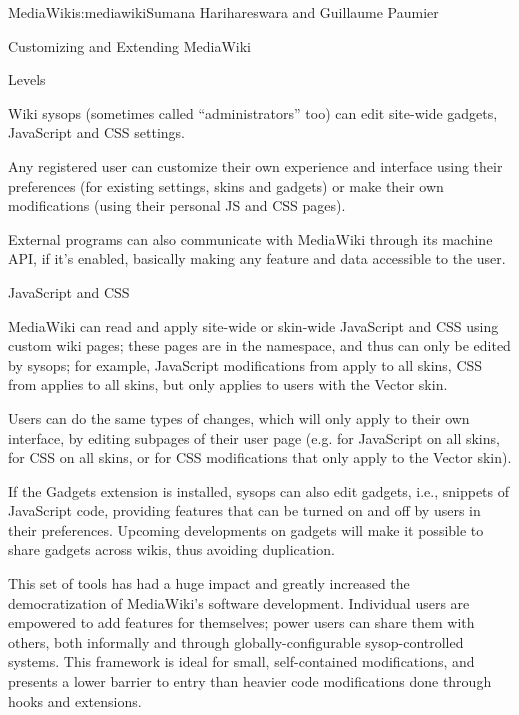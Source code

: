 \begin{aosachapter}{MediaWiki}{s:mediawiki}{Sumana Harihareswara and Guillaume Paumier}
\begin{aosasect1}{Customizing and Extending MediaWiki}
\begin{aosasect2}{Levels}
\begin{aosaitemize}
\item Wiki sysops (sometimes called ``administrators'' too) can edit
  site-wide gadgets, JavaScript and CSS settings.

\item Any registered user can customize their own experience and
  interface using their preferences (for existing settings, skins and
  gadgets) or make their own modifications (using their personal JS
  and CSS pages).

\end{aosaitemize}

External programs can also communicate with MediaWiki through its
machine API, if it's enabled, basically making any feature and data
accessible to the user.

\end{aosasect2}

\begin{aosasect2}{JavaScript and CSS}

MediaWiki can read and apply site-wide or skin-wide JavaScript and CSS
using custom wiki pages; these pages are in the 
namespace, and thus can only be edited by sysops; for example,
JavaScript modifications from  apply to all
skins, CSS from  applies to all skins, but
 only applies to users with the Vector
skin.

Users can do the same types of changes, which will only apply to their
own interface, by editing subpages of their user page
(e.g.  for
JavaScript on all skins,
 for CSS on
all skins, or 
for CSS modifications that only apply to the Vector skin).

If the Gadgets extension is installed, sysops can also edit gadgets,
i.e., snippets of JavaScript code, providing features that can be turned
on and off by users in their preferences. Upcoming developments on
gadgets will make it possible to share gadgets across wikis, thus
avoiding duplication.

This set of tools has had a huge impact and greatly increased the
democratization of MediaWiki's software development. Individual users
are empowered to add features for themselves; power users can share
them with others, both informally and through globally-configurable
sysop-controlled systems. This framework is ideal for small,
self-contained modifications, and presents a lower barrier to entry
than heavier code modifications done through hooks and extensions.


\end{aosasect2}
\end{aosasect1}
\end{aosachapter}
